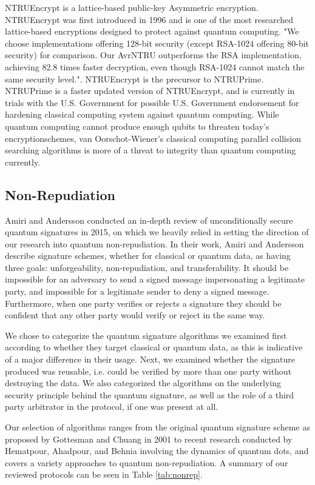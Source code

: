 \documentclass[sigconf]{acmart}
\begin{document}
NTRUEncrypt is a lattice-based public-key Asymmetric encryption. NTRUEncrypt was first introduced in 1996 and is one of the most researched lattice-based encryptions designed to protect against quantum computing. "We choose implementations offering 128-bit security (except RSA-1024 offering 80-bit security) for comparison. Our AvrNTRU outperforms the RSA implementation, achieving 82.8 times faster decryption, even though RSA-1024 cannot match the same security level."\cite{cheng_h._lightweight_2021}. NTRUEncrypt is the precursor to NTRUPrime. NTRUPrime is a faster updated version of NTRUEncrypt, and is currently in trials with the U.S. Government for possible U.S. Government endorsement for hardening classical computing system against quantum computing. While quantum computing cannot produce enough qubits to threaten today's encryptionschemes, van Oorschot-Wiener's classical computing parallel collision searching algorithms is more of a threat to integrity than quantum computing currently\cite{mavroeidis_impact_2018}.

\subsection{Non-Repudiation}
Amiri and Andersson\cite{amiri_unconditionally_2015} conducted an in-depth review of unconditionally secure quantum signatures in 2015, on which we heavily relied in setting the direction of our research into quantum non-repudiation. In their work, Amiri and Andersson describe signature schemes, whether for classical or quantum data, as having three goals: unforgeability, non-repudiation, and transferability. It should be impossible for an adversary to send a signed message impersonating a legitimate party, and impossible for a legitimate sender to deny a signed message. Furthermore, when one party verifies or rejects a signature they should be confident that any other party would verify or reject in the same way.

We chose to categorize the quantum signature algorithms we examined first according to whether they target classical or quantum data, as this is indicative of a major difference in their usage. Next, we examined whether the signature produced was reusable, i.e. could be verified by more than one party without destroying the data. We also categorized the algorithms on the underlying security principle behind the quantum signature, as well as the role of a third party arbitrator in the protocol, if one was present at all.

Our selection of algorithms ranges from the original quantum signature scheme as proposed by Gottesman and Chuang in 2001\cite{gottesman_quantum_2001} to recent research conducted by Hematpour, Ahadpour, and Behnia involving the dynamics of quantum dots\cite{hematpour_presence_2020}, and covers a variety approaches to quantum non-repudiation. A summary of our reviewed protocols can be seen in Table \ref{tab:nonrep}.
\end{document}
